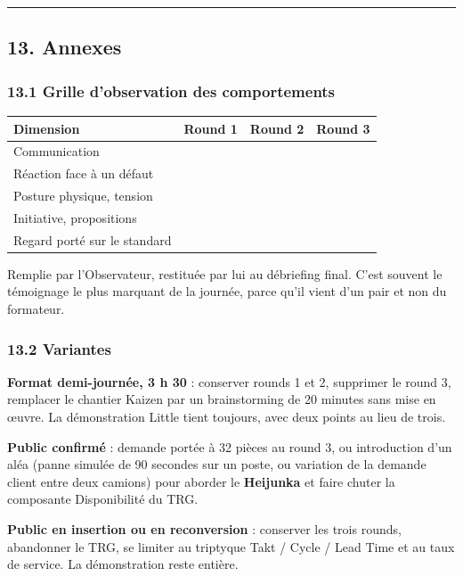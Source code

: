 \documentclass[
]{article}
\newcounter{none} %
\begin{document}
\begin{center}\rule{0.5\linewidth}{0.5pt}\end{center}

\subsection{13. Annexes}\label{annexes}

\subsubsection{13.1 Grille d'observation des
comportements}\label{grille-dobservation-des-comportements}

{\def\LTcaptype{none} %
\begin{longtable}[]{@{}llll@{}}
\toprule\noalign{}
Dimension & Round 1 & Round 2 & Round 3 \\
\midrule\noalign{}
\endhead
\bottomrule\noalign{}
\endlastfoot
Communication & & & \\
Réaction face à un défaut & & & \\
Posture physique, tension & & & \\
Initiative, propositions & & & \\
Regard porté sur le standard & & & \\
\end{longtable}
}

Remplie par l'Observateur, restituée par lui au débriefing final. C'est
souvent le témoignage le plus marquant de la journée, parce qu'il vient
d'un pair et non du formateur.

\subsubsection{13.2 Variantes}\label{variantes}

\textbf{Format demi-journée, 3 h 30} : conserver rounds 1 et 2,
supprimer le round 3, remplacer le chantier Kaizen par un brainstorming
de 20 minutes sans mise en œuvre. La démonstration Little tient
toujours, avec deux points au lieu de trois.

\textbf{Public confirmé} : demande portée à 32 pièces au round 3, ou
introduction d'un aléa (panne simulée de 90 secondes sur un poste, ou
variation de la demande client entre deux camions) pour aborder le
\textbf{Heijunka} et faire chuter la composante Disponibilité du TRG.

\textbf{Public en insertion ou en reconversion} : conserver les trois
rounds, abandonner le TRG, se limiter au triptyque Takt / Cycle / Lead
Time et au taux de service. La démonstration reste entière.
\end{document}
